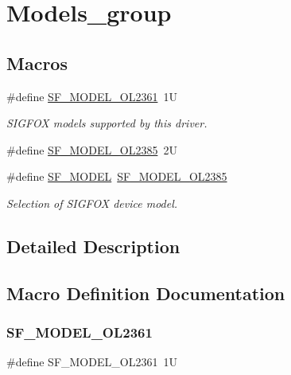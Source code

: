 \hypertarget{group__models__group}{}\section{Models\+\_\+group}
\label{group__models__group}
\subsection*{Macros}
\begin{DoxyCompactItemize}
\item 
\#define \mbox{\hyperlink{group__models__group_gad4979753b6dc59337415527687015ccc}{S\+F\+\_\+\+M\+O\+D\+E\+L\+\_\+\+O\+L2361}}~1U
\begin{DoxyCompactList}\small\item\em S\+I\+G\+F\+OX models supported by this driver. \end{DoxyCompactList}\item 
\#define \mbox{\hyperlink{group__models__group_gaa52e2341e453e43e6d60100c5dcca68f}{S\+F\+\_\+\+M\+O\+D\+E\+L\+\_\+\+O\+L2385}}~2U
\item 
\mbox{\label{group__models__group_gaa91f08a988c51cc9e878d5ad5235f497}} 
\#define \mbox{\hyperlink{group__models__group_gaa91f08a988c51cc9e878d5ad5235f497}{S\+F\+\_\+\+M\+O\+D\+EL}}~\mbox{\hyperlink{group__models__group_gaa52e2341e453e43e6d60100c5dcca68f}{S\+F\+\_\+\+M\+O\+D\+E\+L\+\_\+\+O\+L2385}}
\begin{DoxyCompactList}\small\item\em Selection of S\+I\+G\+F\+OX device model. \end{DoxyCompactList}\end{DoxyCompactItemize}


\subsection{Detailed Description}


\subsection{Macro Definition Documentation}
\mbox{\label{group__models__group_gad4979753b6dc59337415527687015ccc}} 
\subsubsection{\texorpdfstring{SF\_MODEL\_OL2361}{SF\_MODEL\_OL2361}}
{\footnotesize\ttfamily \#define S\+F\+\_\+\+M\+O\+D\+E\+L\+\_\+\+O\+L2361~1U}




